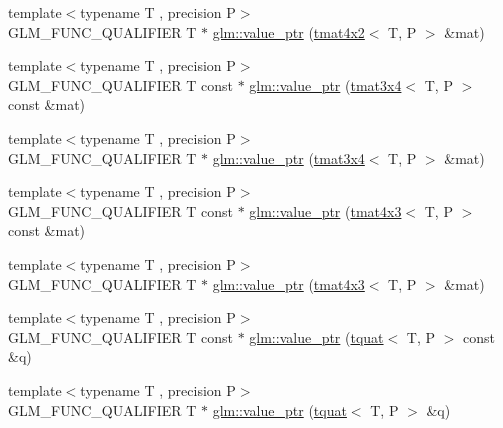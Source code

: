 \begin{DoxyCompactItemize}
{\footnotesize template$<$typename T , precision P$>$ }\\G\+L\+M\+\_\+\+F\+U\+N\+C\+\_\+\+Q\+U\+A\+L\+I\+F\+I\+ER T $\ast$ \hyperlink{group__gtc__type__ptr_ga0e62660f9066864568cd74d76d528a6e}{glm\+::value\+\_\+ptr} (\hyperlink{structglm_1_1tmat4x2}{tmat4x2}$<$ T, P $>$ \&mat)
\item 
{\footnotesize template$<$typename T , precision P$>$ }\\G\+L\+M\+\_\+\+F\+U\+N\+C\+\_\+\+Q\+U\+A\+L\+I\+F\+I\+ER T const  $\ast$ \hyperlink{group__gtc__type__ptr_gacbf08ea2313cad8a42652d4455e69709}{glm\+::value\+\_\+ptr} (\hyperlink{structglm_1_1tmat3x4}{tmat3x4}$<$ T, P $>$ const \&mat)
\item 
{\footnotesize template$<$typename T , precision P$>$ }\\G\+L\+M\+\_\+\+F\+U\+N\+C\+\_\+\+Q\+U\+A\+L\+I\+F\+I\+ER T $\ast$ \hyperlink{group__gtc__type__ptr_gafac7c10d557c3db2f061af0ffe8fc9cf}{glm\+::value\+\_\+ptr} (\hyperlink{structglm_1_1tmat3x4}{tmat3x4}$<$ T, P $>$ \&mat)
\item 
{\footnotesize template$<$typename T , precision P$>$ }\\G\+L\+M\+\_\+\+F\+U\+N\+C\+\_\+\+Q\+U\+A\+L\+I\+F\+I\+ER T const  $\ast$ \hyperlink{group__gtc__type__ptr_ga72b0a496d6c190645accac32f48f64bb}{glm\+::value\+\_\+ptr} (\hyperlink{structglm_1_1tmat4x3}{tmat4x3}$<$ T, P $>$ const \&mat)
\item 
{\footnotesize template$<$typename T , precision P$>$ }\\G\+L\+M\+\_\+\+F\+U\+N\+C\+\_\+\+Q\+U\+A\+L\+I\+F\+I\+ER T $\ast$ \hyperlink{group__gtc__type__ptr_gab9cba81cd8a7eb0afc9ac2b9f4fe05ca}{glm\+::value\+\_\+ptr} (\hyperlink{structglm_1_1tmat4x3}{tmat4x3}$<$ T, P $>$ \&mat)
\item 
{\footnotesize template$<$typename T , precision P$>$ }\\G\+L\+M\+\_\+\+F\+U\+N\+C\+\_\+\+Q\+U\+A\+L\+I\+F\+I\+ER T const  $\ast$ \hyperlink{group__gtc__type__ptr_ga26a38ff14840b35c57fa937711c5168c}{glm\+::value\+\_\+ptr} (\hyperlink{structglm_1_1tquat}{tquat}$<$ T, P $>$ const \&q)
\item 
{\footnotesize template$<$typename T , precision P$>$ }\\G\+L\+M\+\_\+\+F\+U\+N\+C\+\_\+\+Q\+U\+A\+L\+I\+F\+I\+ER T $\ast$ \hyperlink{group__gtc__type__ptr_ga637414d7a9e8877e66a59f3b3d700898}{glm\+::value\+\_\+ptr} (\hyperlink{structglm_1_1tquat}{tquat}$<$ T, P $>$ \&q)
\end{DoxyCompactItemize}



